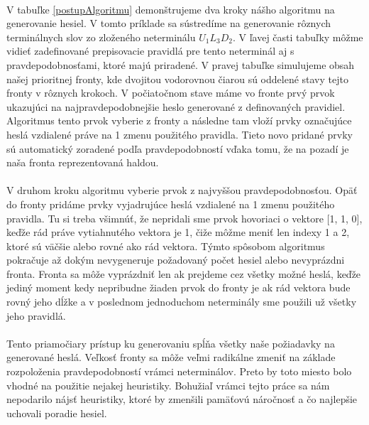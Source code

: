 \paragraph{}
V tabuľke \ref{postupAlgoritmu} demonštrujeme dva kroky nášho algoritmu na generovanie hesiel. V tomto príklade sa sústredíme na generovanie rôznych terminálnych slov zo zloženého neterminálu \(U_1L_3D_2\). V ľavej časti tabuľky môžme vidieť zadefinované prepisovacie pravidlá pre tento neterminál aj s pravdepodobnosťami, ktoré majú priradené. V pravej tabuľke simulujeme obsah našej prioritnej fronty, kde dvojitou vodorovnou čiarou sú oddelené stavy tejto fronty v rôznych krokoch. V počiatočnom stave máme vo fronte prvý prvok ukazujúci na najpravdepodobnejšie heslo generované z definovaných pravidiel. Algoritmus tento prvok vyberie z fronty a následne tam vloží prvky označujúce heslá vzdialené práve na 1 zmenu použitého pravidla. Tieto novo pridané prvky sú automatický zoradené podľa pravdepodobností vďaka tomu, že na pozadí je naša fronta reprezentovaná haldou. 

\paragraph{}
V druhom kroku algoritmu vyberie prvok z najvyššou pravdepodobnosťou. Opäť do fronty pridáme prvky vyjadrujúce heslá vzdialené na 1 zmenu použitého pravidla. Tu si treba všimnúť, že nepridali sme prvok hovoriaci o vektore [1, 1, 0], keďže rád práve vytiahnutého vektora je 1, čiže môžme meniť len indexy 1 a 2, ktoré sú väčšie alebo rovné ako rád vektora. Týmto spôsobom algoritmus pokračuje až dokým nevygeneruje požadovaný počet hesiel alebo nevyprázdni fronta. Fronta sa môže vyprázdniť len ak prejdeme cez všetky možné heslá, keďže jediný moment kedy nepribudne žiaden prvok do fronty je ak rád vektora bude rovný jeho dĺžke a v poslednom jednoduchom neterminály sme použili už všetky jeho pravidlá.

\paragraph{}
Tento priamočiary prístup ku generovaniu spĺňa všetky naše požiadavky na generované heslá. Veľkosť fronty sa môže veľmi radikálne zmeniť na základe rozpoloženia pravdepodobností vrámci neterminálov. Preto by toto miesto bolo vhodné na použitie nejakej heuristiky. Bohužiaľ vrámci tejto práce sa nám nepodarilo nájsť heuristiky, ktoré by zmenšili pamäťovú náročnosť a čo najlepšie uchovali poradie hesiel.
